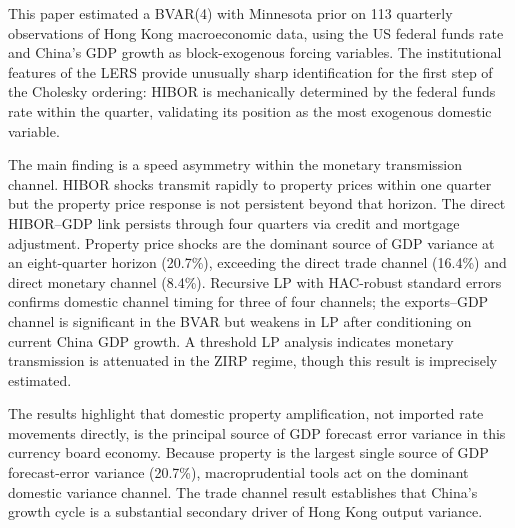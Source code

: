 \documentclass[12pt,a4paper]{article}
\begin{document}
This paper estimated a BVAR(4) with Minnesota prior on 113 quarterly observations
of Hong Kong macroeconomic data, using the US federal funds rate and China's GDP
growth as block-exogenous forcing variables. The institutional features of the
LERS provide unusually sharp identification for the first step of the Cholesky
ordering: HIBOR is mechanically determined by the federal funds rate within the
quarter, validating its position as the most exogenous domestic variable.

The main finding is a speed asymmetry within the monetary transmission channel.
HIBOR shocks transmit rapidly to property prices within one quarter but the
property price response is not persistent beyond that horizon. The direct
HIBOR--GDP link persists through four quarters via credit and mortgage adjustment.
Property price shocks are the dominant source of GDP variance at an eight-quarter
horizon (20.7\%), exceeding the direct trade channel (16.4\%) and direct monetary
channel (8.4\%). Recursive LP with HAC-robust standard errors confirms domestic
channel timing for three of four channels; the exports--GDP channel is significant
in the BVAR but weakens in LP after conditioning on current China GDP growth.
A threshold LP analysis indicates monetary transmission is attenuated in the ZIRP
regime, though this result is imprecisely estimated.

The results highlight that domestic property amplification, not imported rate
movements directly, is the principal source of GDP forecast error variance in this
currency board economy. Because property is the largest single source of GDP
forecast-error variance (20.7\%), macroprudential tools act on the dominant
domestic variance channel. The trade channel result establishes that China's growth
cycle is a substantial secondary driver of Hong Kong output variance.
\end{document}
